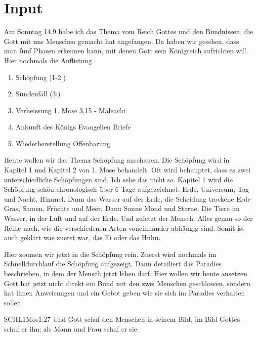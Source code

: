 \documentclass{../../inc/mybib}
\begin{document}
\section{ Input }
\begin{spacing}{1.5}    
    \begin{block}[Einleitung]
        Am Sonntag 14.9 habe ich das Thema vom Reich Gottes und den Bündnissen, die Gott mit uns Menschen gemacht hat angefangen. Da haben wir gesehen, dass man fünf Phasen erkennen kann, mit denen Gott sein Königreich aufrichten will. Hier nochmals die Auflistung.
    \end{block}

    \begin{enumerate}
    \item Schöpfung  (1-2:)
    \item Sündenfall  (3:)
    \item Verheissung 1. Mose 3,15 - Maleachi
    \item Ankunft des Königs Evangelien Briefe
    \item Wiederherstellung Offenbarung
   \end{enumerate}        
    \begin{block}
       Heute wollen wir das Thema Schöpfung anschauen. Die Schöpfung wird in Kapitel 1 und Kapitel 2 von 1. Mose behandelt. Oft wird behauptet, dass es zwei unterschiedliche Schöpfungen sind. Ich sehe das nicht so. Kapitel 1 wird die Schöpfung schön chronologisch über 6 Tage aufgezeichnet. Erde, Universum, Tag und Nacht, Himmel. Dann das Wasser auf der Erde, die Scheidung trockene Erde Gras, Samen, Früchte und Meer. Dann Sonne Mond und Sterne. Die Tiere im Wasser, in der Luft und auf der Erde. Und zuletzt der Mensch.
       Alles genau so der Reihe nach, wie die verschiedenen Arten voneinnander abhängig sind. Somit ist auch geklärt was zuerst war, das Ei oder das Huhn. 
    \end{block}

   \begin{block}
    Hier zoomen wir jetzt in die Schöpfung rein. Zuerst wird nochmals im Schnelldurchlauf die Schöpfung aufgezeigt. Dann detailiert das Paradies beschrieben, in dem der Mensch jetzt leben darf. Hier wollen wir heute ansetzen. Gott hat jetzt nicht direkt ein Bund mit den zwei Menschen geschlossen, sondern hat ihnen Anweisungen und ein Gebot geben wie sie sich im Paradies verhalten sollen. 
    \begin{bibelbox}{SCHL}{1Mos}{1:27}
        Und Gott schuf den Menschen in seinem Bild, im Bild Gottes schuf er ihn; als Mann und Frau schuf er sie.
    \end{bibelbox}


\end{block}
\end{spacing}
\end{document}
